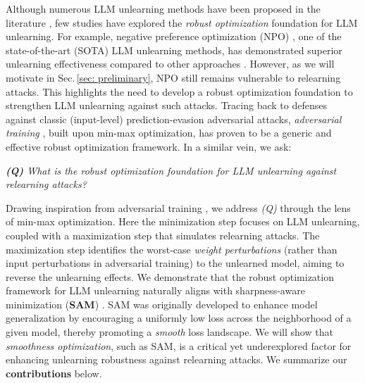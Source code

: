 Although numerous LLM unlearning methods have been proposed in the literature \citep{yao2024large,maini2024tofu,ji2024reversing,zhang2024negative,liu2024large,ji2024reversing,li2024wmdp,jia2024wagle,jia2024soul}, few studies have explored the \textit{robust optimization} foundation for LLM unlearning. For example, negative preference optimization (NPO) \citep{zhang2024negative}, one of the state-of-the-art (SOTA) LLM unlearning methods, has demonstrated superior unlearning effectiveness compared to other approaches  \citep{shi2024muse}. However, as we will motivate in Sec.\,\ref{sec: preliminary}, NPO still remains vulnerable to relearning attacks. This highlights the need to develop a robust optimization foundation to strengthen LLM unlearning against such attacks.
Tracing back to defenses against classic (input-level) prediction-evasion adversarial attacks, \textit{adversarial training} \citep{madry2018towards}, built upon min-max optimization, has proven to be a generic and effective robust optimization framework. In a similar vein, we ask:
\begin{tcolorbox}[before skip=2mm, after skip=0.0cm, boxsep=0.0cm, middle=0.0cm, top=0.05cm, bottom=0.05cm, boxrule=0.6pt]
\begin{center}
     \textit{\textbf{(Q)} What is the robust optimization foundation for LLM unlearning against relearning attacks?}
\end{center}
\end{tcolorbox} 
\vspace*{2mm}

Drawing inspiration from adversarial training \citep{madry2018towards}, we address \textit{(Q)} through the lens of min-max optimization.  Here the minimization step focuses on LLM unlearning, coupled with a maximization step that simulates relearning attacks. The maximization step identifies the worst-case \textit{weight perturbations}  (rather than input perturbations in adversarial training) to the unlearned model, aiming to reverse the unlearning effects.
We demonstrate that the robust optimization framework for LLM unlearning naturally aligns with sharpness-aware minimization (\textbf{SAM}) \citep{foret2021sharpnessaware}. SAM was originally developed to enhance model generalization by encouraging a uniformly low loss across the neighborhood of a given model, thereby promoting a \textit{smooth} loss landscape.
We will show that \textit{smoothness optimization}, such as SAM, is a critical yet underexplored factor for enhancing unlearning robustness against relearning attacks. 
We summarize our \textbf{contributions} below. 

